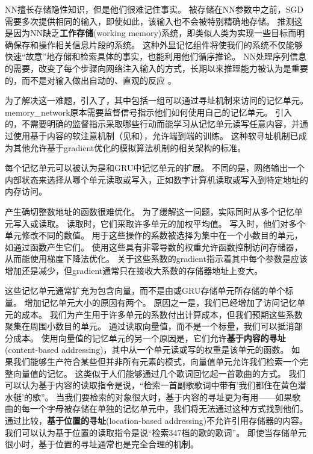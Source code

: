 \gls{NN}擅长存储隐性知识，但是他们很难记住事实。
被存储在\gls{NN}参数中之前，\gls{SGD}需要多次提供相同的输入，即使如此，该输入也不会被特别精确地存储。
\citet{Graves-et-al-arxiv2014}推测这是因为\gls{NN}缺乏\textbf{工作存储}(working memory)系统，即类似人类为实现一些目标而明确保存和操作相关信息片段的系统。
这种外显记忆组件将使我们的系统不仅能够快速``故意''地存储和检索具体的事实，也能利用他们循序推论。
\gls{NN}处理序列信息的需要，改变了每个步骤向网络注入输入的方式，长期以来推理能力被认为是重要的，而不是对输入做出自动的、直观的反应\citep{hinton1990mapping} 。


为了解决这一难题，\citep{Weston2014}引入了，其中包括一组可以通过寻址机制来访问的记忆单元。
\gls{memory_network}原本需要监督信号指示他们如何使用自己的记忆单元。
\citep{Graves-et-al-arxiv2014}引入的，不需要明确的监督指示采取哪些行动而能学习从记忆单元读写任意内容，并通过使用基于内容的软注意机制（见\citep{Bahdanau-et-al-ICLR2015-small}和），允许端到端的训练。
这种软寻址机制已成为其他允许基于\gls{gradient}优化的模拟算法机制的相关架构的标准\citep{Sukhbaatar2015,Joulin+Mikolov-2015,Kumar-et-al-2015,Vinyals2015,Grefenstette-et-al-NIPS2015}。

每个记忆单元可以被认为是和GRU中记忆单元的扩展。
不同的是，网络输出一个内部状态来选择从哪个单元读取或写入，正如数字计算机读取或写入到特定地址的内存访问。


产生确切整数地址的函数很难优化。
为了缓解这一问题，实际同时从多个记忆单元写入或读取。
读取时，它们采取许多单元的加权平均值。
写入时，他们对多个单元修改不同的数值。
用于这些操作的系数被选择为集中在一个小数目的单元，如通过函数产生它们。
使用这些具有非零导数的权重允许函数控制访问存储器，从而能使用梯度下降法优化。
关于这些系数的\gls{gradient}指示着其中每个参数是应该增加还是减少，但\gls{gradient}通常只在接收大系数的存储器地址上变大。

这些记忆单元通常扩充为包含向量，而不是由或GRU存储单元所存储的单个标量。
增加记忆单元大小的原因有两个。
原因之一是，我们已经增加了访问记忆单元的成本。
我们为产生用于许多单元的系数付出计算成本，但我们预期这些系数聚集在周围小数目的单元。
通过读取向量值，而不是一个标量，我们可以抵消部分成本。 
使用向量值的记忆单元的另一个原因是，它们允许\textbf{基于内容的寻址}(content-based addressing)，其中从一个单元读或写的权重是该单元的函数。
如果我们能够生产符合某些但并非所有元素的模式，向量值单元允许我们检索一个完整向量值的记忆。
这类似于人们能够通过几个歌词回忆起一首歌曲的方式。
我们可以认为基于内容的读取指令是说，``检索一首副歌歌词中带有'我们都住在黄色潜水艇'的歌''。
当我们要检索的对象很大时，基于内容的寻址更为有用——如果歌曲的每一个字母被存储在单独的记忆单元中，我们将无法通过这种方式找到他们。
通过比较，\textbf{基于位置的寻址}(location-based addressing)不允许引用存储器的内容。
我们可以认为基于位置的读取指令是说``检索347档的歌的歌词''。
即使当存储单元很小时，基于位置的寻址通常也是完全合理的机制。


